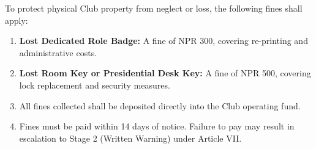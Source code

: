 
To protect physical Club property from neglect or loss, the following fines shall apply:
\begin{enumerate}[label=\alph*), leftmargin=2em, itemsep=0.3em]
    \item \textbf{Lost Dedicated Role Badge:} A fine of NPR 300, covering re-printing and administrative costs.
    \item \textbf{Lost Room Key or Presidential Desk Key:} A fine of NPR 500, covering lock replacement and security measures.
    \item All fines collected shall be deposited directly into the Club operating fund.
    \item Fines must be paid within 14 days of notice. Failure to pay may result in escalation to Stage 2 (Written Warning) under Article VII.
\end{enumerate}

